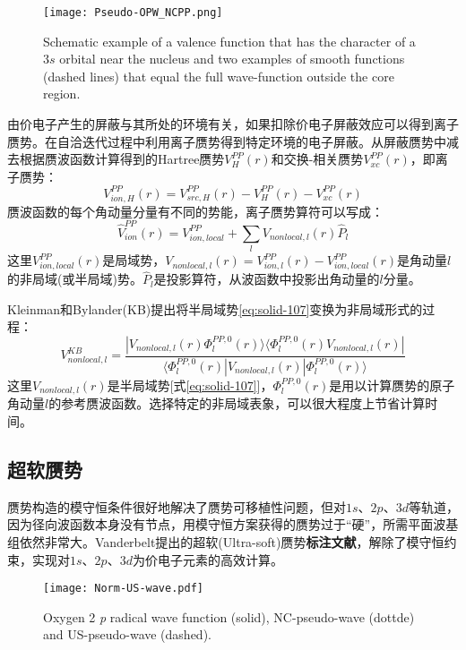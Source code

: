 \begin{figure}[h!]
\centering
\vspace*{-0.10in}
\texttt{[image: Pseudo-OPW\_NCPP.png]}
\caption{\small \textrm{Schematic example of a valence function that has the character of a $3s$ orbital near the nucleus and two examples of smooth functions (dashed lines) that equal the full wave-function outside the core region.}}%
\label{Pseudo-OPW_NCPP}
\end{figure}
由价电子产生的屏蔽与其所处的环境有关，如果扣除价电子屏蔽效应可以得到离子赝势。在自洽迭代过程中利用离子赝势得到特定环境的电子屏蔽。从屏蔽赝势中减去根据赝波函数计算得到的Hartree赝势$V_H^{PP}(r)$和交换-相关赝势$V_{xc}^{PP}(r)$，即离子赝势\cite{PRB43-1993_1991}：
$$V_{ion,H}^{PP}(r)=V_{src,H}^{PP}(r)-V_H^{PP}(r)-V_{xc}^{PP}(r)$$
赝波函数的每个角动量分量有不同的势能，离子赝势算符可以写成：
\begin{equation}
  \hat V_{ion}^{PP}(r)=V_{ion,local}^{PP}+\sum_lV_{nonlocal,l}(r)\hat P_l
  \label{eq:solid-107}
\end{equation}
这里$V_{ion,local}^{PP}(r)$是局域势，$V_{nonlocal,l}(r)=V_{ion,l}^{PP}(r)-V_{ion,local}^{PP}(r)$是角动量$l$的非局域(或半局域)势。$\hat P_l$是投影算符，从波函数中投影出角动量的$l$分量。

Kleinman和Bylander(KB)\cite{PRL48-1425_1982}提出将半局域势\eqref{eq:solid-107}变换为非局域形式的过程：
$$V_{nonlocal,l}^{KB}=\dfrac{|V_{nonlocal,l}(r)\Phi_l^{PP,0}(r)\rangle\langle\Phi_l^{PP,0}(r)V_{nonlocal,l}(r)|}{\langle\Phi_l^{PP,0}(r)|V_{nonlocal,l}(r)|\Phi_l^{PP,0}(r)\rangle}$$
这里$V_{nonlocal,l}(r)$是半局域势[式\eqref{eq:solid-107}]，$\Phi_l^{PP,0}(r)$是用以计算赝势的原子角动量$l$的参考赝波函数。选择特定的非局域表象，可以很大程度上节省计算时间。

\subsection{超软赝势}
赝势构造的模守恒条件很好地解决了赝势可移植性问题，但对$1s$、$2p$、$3d$等轨道，因为径向波函数本身没有节点，用模守恒方案获得的赝势过于“硬”，所需平面波基组依然非常大。\textrm{Vanderbelt}提出的超软\textrm{(Ultra-soft)}赝势\textbf{标注文献}，解除了模守恒约束，实现对$1s$、$2p$、$3d$为价电子元素的高效计算。
\begin{figure}[h!]
\centering
\texttt{[image: Norm-US-wave.pdf]}
\caption{\small \textrm{Oxygen 2} \textit{p} \textrm{radical wave function (solid), NC-pseudo-wave (dottde) and US-pseudo-wave (dashed).}}%
\label{Norm-US-wave}
\end{figure}

